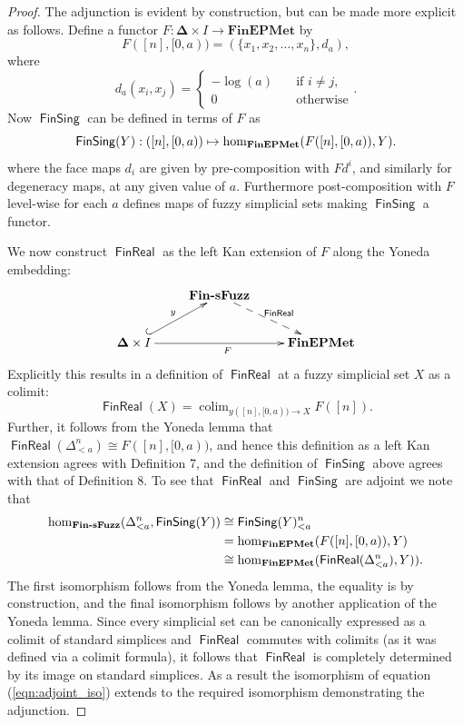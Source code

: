 \documentclass[12pt]{article}
\DeclareMathOperator{\FinReal}{\mathsf{FinReal}}
\DeclareMathOperator{\FinSing}{\mathsf{FinSing}}
\DeclareMathOperator*{\colim}{colim}
\begin{document}
\begin{proof}
The adjunction is evident by construction, but can be made more explicit as follows. Define a functor $F:\boldsymbol{\Delta}\times I \to\mathbf{FinEPMet}$ by
\[
F([n], [0,a)) = (\{x_1, x_2, \ldots, x_n\}, d_a),
\]
where
\[
d_a(x_i, x_j) = \begin{cases}
    -\log(a) & \quad\text{if } i \neq j,\\[4pt]
    0 & \quad\text{otherwise}
\end{cases}.
\]
Now $\FinSing$ can be defined in terms of $F$ as 
\[
\FinSing(Y): ([n], [0,a)) \mapsto \hom_{\text{\bf FinEPMet}}(F([n], [0,a)), Y).
\]
where the face maps $d_i$ are given by pre-composition with $Fd^i$, and similarly for degeneracy maps, at any given value of $a$. Furthermore post-composition with $F$ level-wise for each $a$ defines maps of fuzzy simplicial sets making $\FinSing$ a functor.

We now construct $\FinReal$ as the left Kan extension of $F$ along the Yoneda embedding:
\[
\xymatrix{
 & \text{\rm \bf Fin-sFuzz} \ar@{-->}[dr]^{\FinReal} & \\
 \boldsymbol{\Delta} \times I \ar@{^{(}->}[ur]^y \ar[rr]_F & & \mathbf{FinEPMet} 
}
\]
Explicitly this results in a definition of $\FinReal$ at a fuzzy simplicial set $X$ as a colimit:
\[
\FinReal(X) = \colim_{y([n], [0,a)) \to X} F([n]).
\]
Further, it follows from the Yoneda lemma that $\FinReal(\Delta^n_{<a})\cong F([n], [0,a))$, and hence this definition as a left Kan extension agrees with Definition 7, and the definition of $\FinSing$ above agrees with that of Definition 8. To see that $\FinReal$ and $\FinSing$ are adjoint we note that
\begin{equation}\label{eqn:adjoint_iso}
\begin{split}
\hom_{\text{\rm \bf Fin-sFuzz}}(\Delta^n_{<a}, \FinSing(Y)) & \cong \FinSing(Y)^n_{<a}\\
 & = \hom_{\mathbf{FinEPMet}}(F([n], [0,a)), Y)\\
 & \cong \hom_{\mathbf{FinEPMet}}(\FinReal(\Delta^n_{<a}), Y)).
 \end{split}
\end{equation}
The first isomorphism follows from the Yoneda lemma, the equality is by construction, and the final isomorphism follows by another application of the Yoneda lemma. Since every simplicial set can be canonically expressed as a colimit of standard simplices and $\FinReal$ commutes with colimits (as it was defined via a colimit formula), it follows that $\FinReal$ is completely determined by its image on standard simplices. As a result the isomorphism of equation (\ref{eqn:adjoint_iso}) extends to the required isomorphism demonstrating the adjunction.
\end{proof}
\end{document}
